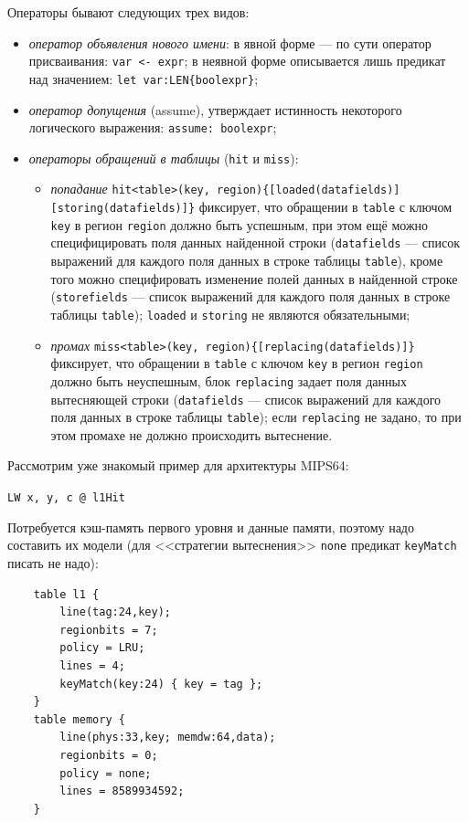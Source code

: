 \documentclass[14pt]{extreport}
\begin{document}
Операторы бывают следующих трех видов:
\begin{itemize}
    \item \emph{оператор объявления нового имени}: в явной форме --- по сути
оператор присваивания: \texttt{var <- expr}; в неявной форме описывается лишь
предикат над значением: \texttt{let var:LEN\{boolexpr\}};
    \item \emph{оператор допущения} (assume), утверждает истинность некоторого
логического выражения: \texttt{assume: boolexpr};
    \item \emph{операторы обращений в таблицы} (\texttt{hit} и \texttt{miss}):
        \begin{itemize}
            \item \emph{попадание} \texttt{hit<table>(key,
region)\{[loaded(datafields)]}\\\texttt{[storing(datafields)]\}} фиксирует, что
обращении в \texttt{table} с ключом \texttt{key} в регион \texttt{region} должно
быть успешным, при этом ещё можно специфицировать поля данных найденной строки
(\texttt{datafields} --- список выражений для каждого поля данных в строке
таблицы \texttt{table}), кроме того можно специфировать изменение полей данных в
найденной строке (\texttt{storefields} --- список выражений для каждого поля
данных в строке таблицы \texttt{table}); \texttt{loaded} и \texttt{storing} не
являются обязательными;
            \item \emph{промах} \texttt{miss<table>(key,
region)\{[replacing(datafields)]\}}\\фиксирует, что обращении в \texttt{table} с
ключом \texttt{key} в регион \texttt{region} должно быть неуспешным, блок
\texttt{replacing} задает поля данных вытесняющей строки (\texttt{datafields}
--- список выражений для каждого поля данных в строке таблицы \texttt{table});
если \texttt{replacing} не задано, то при этом промахе не должно происходить
вытеснение.
        \end{itemize}
\end{itemize}


Рассмотрим уже знакомый пример для архитектуры MIPS64:

\texttt{LW x, y, c @ l1Hit}

Потребуется кэш-память первого уровня и данные памяти, поэтому надо составить их
модели (для <<стратегии вытеснения>> \texttt{none} предикат \texttt{keyMatch}
писать не надо):
\begin{verbatim}
    table l1 {
        line(tag:24,key);
        regionbits = 7;
        policy = LRU;
        lines = 4;
        keyMatch(key:24) { key = tag };
    }
    table memory {
        line(phys:33,key; memdw:64,data);
        regionbits = 0;
        policy = none;
        lines = 8589934592;
    }
\end{verbatim}
\end{document}
